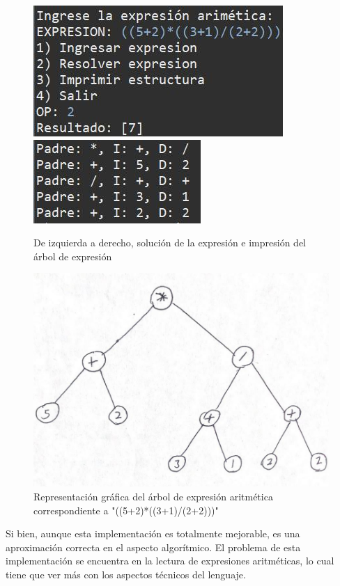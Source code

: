 \documentclass[letterpaper, 11pt]{article}
\begin{document}
	\begin{figure}[H]
		\centering
		\includegraphics[scale=0.5]{Imagenes/AEA1}
		\hfil
		\includegraphics[scale=0.5]{Imagenes/AEA2}
		\caption{De izquierda a derecho, solución de la expresión e impresión del árbol de expresión}
	\end{figure}
	
	\begin{figure}[H]
		\centering
		\includegraphics[scale=0.3]{Imagenes/AEA}
		\caption{Representación gráfica del árbol de expresión aritmética correspondiente a "((5+2)*((3+1)/(2+2)))"}
	\end{figure}
	
	Si bien, aunque esta implementación es totalmente mejorable, es una aproximación correcta en el aspecto algorítmico. El problema de esta implementación se encuentra en la lectura de expresiones aritméticas, lo cual tiene que ver más con los aspectos técnicos del lenguaje.
	
\end{document}
